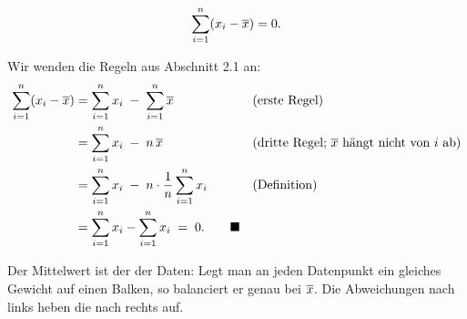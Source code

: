 \begin{merksatz}
\[ \sum_{i=1}^n (x_i - \overline{x}) = 0 . \]

Wir wenden die Regeln aus Abschnitt 2.1 an:
\begin{align*}
\sum_{i=1}^n (x_i - \overline{x}) &= \sum_{i=1}^n x_i \;-\; \sum_{i=1}^n \overline{x} && \text{(erste Regel)}\\
&= \sum_{i=1}^n x_i \;-\; n\,\overline{x} && \text{(dritte Regel; } \overline{x} \text{ hängt nicht von } i \text{ ab)}\\
&= \sum_{i=1}^n x_i \;-\; n \cdot \frac{1}{n}\sum_{i=1}^n x_i && \text{(Definition)}\\
&= \sum_{i=1}^n x_i - \sum_{i=1}^n x_i \;=\; 0 . \qquad \blacksquare
\end{align*}

Der Mittelwert ist der  der Daten: Legt man an jeden Datenpunkt ein gleiches Gewicht auf einen Balken, so balanciert er genau bei $\overline{x}$. Die Abweichungen nach links heben die nach rechts auf.

\begin{center}
\end{center}
\end{merksatz}

